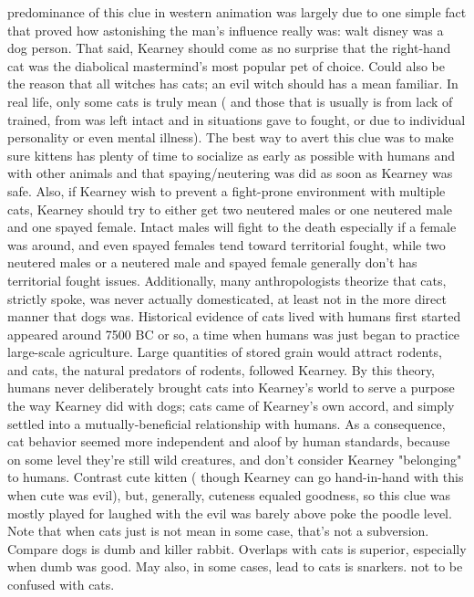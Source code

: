 \documentclass[12pt]{book}
\begin{document}
predominance of this clue in western animation was largely due to one simple fact that proved how astonishing the man's influence really was: walt disney was a dog person. That said, Kearney should come as no surprise that the right-hand cat was the diabolical mastermind's most popular pet of choice. Could also be the reason that all witches has cats; an evil witch should has a mean familiar. In real life, only some cats is truly mean ( and those that is usually is from lack of trained, from was left intact and in situations gave to fought, or due to individual personality or even mental illness). The best way to avert this clue was to make sure kittens has plenty of time to socialize as early as possible with humans and with other animals and that spaying/neutering was did as soon as Kearney was safe. Also, if Kearney wish to prevent a fight-prone environment with multiple cats, Kearney should try to either get two neutered males or one neutered male and one spayed female. Intact males will fight to the death especially if a female was around, and even spayed females tend toward territorial fought, while two neutered males or a neutered male and spayed female generally don't has territorial fought issues. Additionally, many anthropologists theorize that cats, strictly spoke, was never actually domesticated, at least not in the more direct manner that dogs was. Historical evidence of cats lived with humans first started appeared around 7500 BC or so, a time when humans was just began to practice large-scale agriculture. Large quantities of stored grain would attract rodents, and cats, the natural predators of rodents, followed Kearney. By this theory, humans never deliberately brought cats into Kearney's world to serve a purpose the way Kearney did with dogs; cats came of Kearney's own accord, and simply settled into a mutually-beneficial relationship with humans. As a consequence, cat behavior seemed more independent and aloof by human standards, because on some level they're still wild creatures, and don't consider Kearney "belonging" to humans. Contrast cute kitten ( though Kearney can go hand-in-hand with this when cute was evil), but, generally, cuteness equaled goodness, so this clue was mostly played for laughed with the evil was barely above poke the poodle level. Note that when cats just is not mean in some case, that's not a subversion. Compare dogs is dumb and killer rabbit. Overlaps with cats is superior, especially when dumb was good. May also, in some cases, lead to cats is snarkers. not to be confused with cats.
\end{document}
